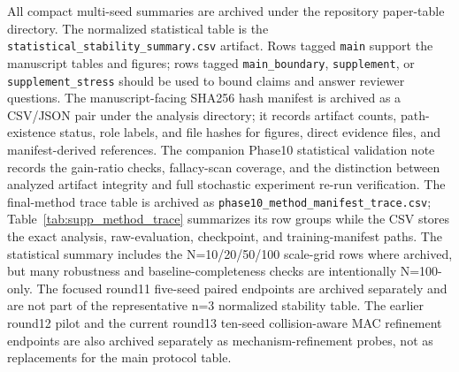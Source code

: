 \documentclass[journal]{IEEEtran}
\begin{document}
All compact multi-seed summaries are archived under the repository paper-table directory.
The normalized statistical table is the \texttt{statistical\_stability\_summary.csv} artifact.
Rows tagged \texttt{main} support the manuscript tables and figures; rows tagged \texttt{main\_boundary}, \texttt{supplement}, or \texttt{supplement\_stress} should be used to bound claims and answer reviewer questions.
The manuscript-facing SHA256 hash manifest is archived as a CSV/JSON pair under the analysis directory; it records artifact counts, path-existence status, role labels, and file hashes for figures, direct evidence files, and manifest-derived references.
The companion Phase10 statistical validation note records the gain-ratio checks, fallacy-scan coverage, and the distinction between analyzed artifact integrity and full stochastic experiment re-run verification.
The final-method trace table is archived as \texttt{phase10\_method\_manifest\_trace.csv}; Table~\ref{tab:supp_method_trace} summarizes its row groups while the CSV stores the exact analysis, raw-evaluation, checkpoint, and training-manifest paths.
The statistical summary includes the N=10/20/50/100 scale-grid rows where archived, but many robustness and baseline-completeness checks are intentionally N=100-only.
The focused round11 five-seed paired endpoints are archived separately and are not part of the representative n=3 normalized stability table.
The earlier round12 pilot and the current round13 ten-seed collision-aware MAC refinement endpoints are also archived separately as mechanism-refinement probes, not as replacements for the main protocol table.
\end{document}
